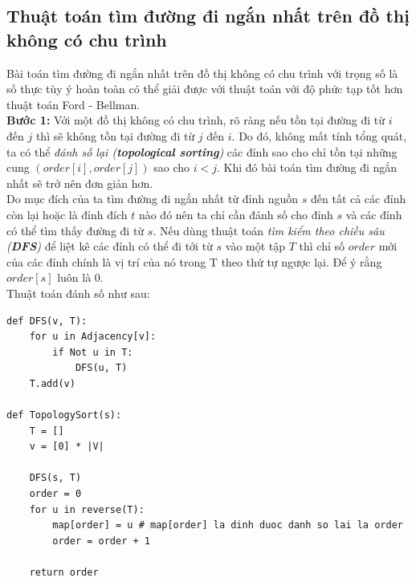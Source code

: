\documentclass[a4paper,12pt]{report}
\begin{document}

\subsection{Thuật toán tìm đường đi ngắn nhất trên đồ thị không có chu trình}
	Bài toán tìm đường đi ngắn nhất trên đồ thị không có chu trình với
        trọng số là số thực tùy ý hoàn toàn có thể giải được với thuật toán 
        với độ phức tạp tốt hơn thuật toán Ford - Bellman.\\

        \textbf{Bước 1:} Với một đồ thị không có chu trình, rõ ràng nếu tồn tại đường đi từ $i$
        đến $j$ thì sẽ không tồn tại đường đi từ $j$ đến $i$. Do đó, không mất
        tính tổng quát, ta có thể \textit{đánh số lại (\textbf{topological
        sorting})}
        các đỉnh sao cho chỉ tồn tại những cung $(order[i], order[j])$ sao cho $i < j$. Khi
        đó bài toán tìm đường đi ngắn nhất sẽ trở nên đơn giản hơn.\\

        Do mục đích của ta tìm đường đi ngắn nhất từ đỉnh nguồn $s$ đến tất cả
        các đỉnh còn lại hoặc là đỉnh đích $t$ nào đó nên ta chỉ cần đánh số
        cho đỉnh $s$ và các đỉnh có thể tìm thấy đường đi từ $s$. Nếu dùng
        thuật toán \textit{tìm kiểm theo chiều sâu (\textbf{DFS})} để liệt kê
        các đỉnh có thể đi tới từ $s$ vào một tập $T$ thì chỉ số $order$ mới của
        các đỉnh chính là vị trí của nó trong T theo thứ tự ngược lại. Để ý
        rằng $order[s]$ luôn là $0$.\\

        Thuật toán đánh số như sau:\\

        \begin{verbatim}
def DFS(v, T):
    for u in Adjacency[v]:
        if Not u in T:
            DFS(u, T)
    T.add(v)

def TopologySort(s):
    T = []
    v = [0] * |V|

    DFS(s, T)
    order = 0
    for u in reverse(T):
        map[order] = u # map[order] la dinh duoc danh so lai la order
        order = order + 1

    return order
        \end{verbatim}
\end{document}
